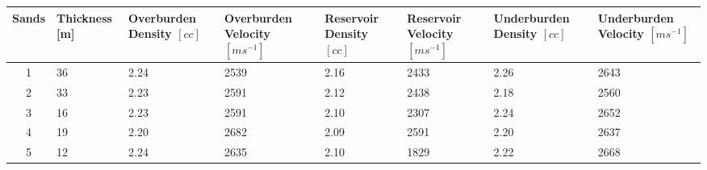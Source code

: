 \begin{tabularx}{\linewidth}{@{} C *{7}{L} @{}}
    \toprule
    Sands &
    Thickness [m] & 
    Overburden Density $[cc]$ & 
    Overburden Velocity $[ms^{-1}]$ &
    Reservoir Density $[cc]$ & 
    Reservoir Velocity $[ms^{-1}]$ &
    Underburden Density $[cc]$ &
    Underburden Velocity $[ms^{-1}]$ \\
    
     & 36 & 2.24 & 2539 & 2.16 & 2433 & 2.26 & 2643 \\
    2 & 33 & 2.23 & 2591 & 2.12 & 2438 & 2.18 & 2560 \\
    3 & 16 & 2.23 & 2591 & 2.10 & 2307 & 2.24 & 2652 \\
    4 & 19 & 2.20 & 2682 & 2.09 & 2591 & 2.20 & 2637 \\
    5 & 12 & 2.24 & 2635 & 2.10 & 1829 & 2.22 & 2668 \\
    \bottomrule
\end{tabularx}